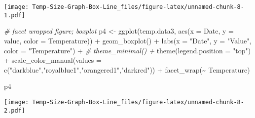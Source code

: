 \documentclass[
]{article}
\newenvironment{Shaded}{\begin{snugshade}}{\end{snugshade}}
\newcommand{\AttributeTok}[1]{\textcolor[rgb]{0.77,0.63,0.00}{#1}}
\newcommand{\CommentTok}[1]{\textcolor[rgb]{0.56,0.35,0.01}{\textit{#1}}}
\newcommand{\FunctionTok}[1]{\textcolor[rgb]{0.00,0.00,0.00}{#1}}
\newcommand{\NormalTok}[1]{#1}
\newcommand{\OtherTok}[1]{\textcolor[rgb]{0.56,0.35,0.01}{#1}}
\newcommand{\SpecialCharTok}[1]{\textcolor[rgb]{0.00,0.00,0.00}{#1}}
\newcommand{\StringTok}[1]{\textcolor[rgb]{0.31,0.60,0.02}{#1}}
\begin{document}
\texttt{[image: Temp-Size-Graph-Box-Line\_files/figure-latex/unnamed-chunk-8-1.pdf]}

\begin{Shaded}
\begin{Highlighting}[]
\CommentTok{\# facet wrapped figure; boxplot}
\NormalTok{p4 }\OtherTok{\textless{}{-}} \FunctionTok{ggplot}\NormalTok{(temp.data3, }\FunctionTok{aes}\NormalTok{(}\AttributeTok{x =}\NormalTok{ Date, }\AttributeTok{y =}\NormalTok{ value, }\AttributeTok{color =}\NormalTok{ Temperature)) }\SpecialCharTok{+}
             \FunctionTok{geom\_boxplot}\NormalTok{() }\SpecialCharTok{+}
             \FunctionTok{labs}\NormalTok{(}\AttributeTok{x =} \StringTok{"Date"}\NormalTok{, }\AttributeTok{y =} \StringTok{"Value"}\NormalTok{, }\AttributeTok{color =} \StringTok{"Temperature"}\NormalTok{) }\SpecialCharTok{+}
             \CommentTok{\# theme\_minimal() +}
             \FunctionTok{theme}\NormalTok{(}\AttributeTok{legend.position =} \StringTok{"top"}\NormalTok{) }\SpecialCharTok{+} 
             \FunctionTok{scale\_color\_manual}\NormalTok{(}\AttributeTok{values =} \FunctionTok{c}\NormalTok{(}\StringTok{"darkblue"}\NormalTok{,}\StringTok{"royalblue1"}\NormalTok{,}\StringTok{"orangered1"}\NormalTok{,}\StringTok{"darkred"}\NormalTok{)) }\SpecialCharTok{+} \FunctionTok{facet\_wrap}\NormalTok{(}\SpecialCharTok{\textasciitilde{}}\NormalTok{ Temperature)}

\NormalTok{p4}
\end{Highlighting}
\end{Shaded}

\texttt{[image: Temp-Size-Graph-Box-Line\_files/figure-latex/unnamed-chunk-8-2.pdf]}
\end{document}
